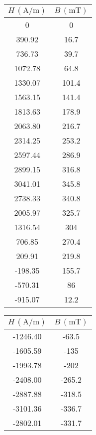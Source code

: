 \documentclass[12pt]{article}
\begin{document}
\begin{table}[htbp]
    \centering
      \begin{tabular}{|c|c|}
      \hline
      $H\,(\mathrm{A/m})$ & $B\,(\mathrm{mT})$ \\
      \hline
      0     & 0 \\
      \hline
      390.92  & 16.7 \\
      \hline
      736.73  & 39.7 \\
      \hline
      1072.78  & 64.8 \\
      \hline
      1330.07  & 101.4 \\
      \hline
      1563.15  & 141.4 \\
      \hline
      1813.63  & 178.9 \\
      \hline
      2063.80  & 216.7 \\
      \hline
      2314.25  & 253.2 \\
      \hline
      2597.44  & 286.9 \\
      \hline
      2899.15  & 316.8 \\
      \hline
      3041.01  & 345.8 \\
      \hline
      2738.33  & 340.8 \\
      \hline
      2005.97  & 325.7 \\
      \hline
      1316.54  & 304 \\
      \hline
      706.85  & 270.4 \\
      \hline
      209.91  & 219.8 \\
      \hline
      -198.35  & 155.7 \\
      \hline
      -570.31  & 86 \\
      \hline
      -915.07  & 12.2 \\
      \hline
      \end{tabular}%
      \quad
      \begin{tabular}{|c|c|}
        \hline
        $H\,(\mathrm{A/m})$ & $B\,(\mathrm{mT})$ \\
        \hline
        -1246.40  & -63.5 \\
        \hline
        -1605.59  & -135 \\
        \hline
        -1993.78  & -202 \\
        \hline
        -2408.00  & -265.2 \\
        \hline
        -2887.88  & -318.5 \\
        \hline
        -3101.36  & -336.7 \\
        \hline
        -2802.01  & -331.7 \\

\end{tabular}
\end{table}
\end{document}
